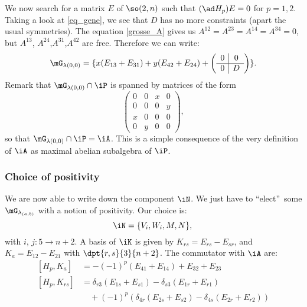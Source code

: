 We now search for a matrix $E$ of $\so(2,n)$ such that $(\ad H_p)E=0$ for $p=1,2$. Taking a look at \eqref{eq_gene}, we see that $D$ has no more constraints (apart the usual symmetries). The equation \eqref{grosse_A} gives us $A^{12}=A^{23}=A^{14}=A^{34}=0$, but $A^{13}$, $A^{24}$,$A^{31}$,$A^{42}$ are free. Therefore we can write:
\begin{equation}
	\mG_{\lambda(0,0)}=\{x(E_{13}+E_{31})+y(E_{42}+E_{24})+
	\left(\begin{array}{c|c}
			0 & 0 \\
			\hline
			0 & D
		\end{array}\right)
	\}.
\end{equation}
Remark that $\mG_{\lambda(0,0)}\cap\iP$ is spanned by matrices of the form
\[
	\begin{pmatrix}
		0 & 0 & x & 0 \\
		0 & 0 & 0 & y \\
		x & 0 & 0 & 0 \\
		0 & y & 0 & 0
	\end{pmatrix},
\]
so that $\mG_{\lambda(0,0)}\cap\iP=\iA$. This is a simple consequence of the very definition of $\iA$ as maximal abelian subalgebra of $\iP$.

\subsubsection{Choice of positivity}

We are now able to write down the component $\iN$. We just have to ``elect''\ some $\mG_{\lambda_{(a,b)}}$ with a notion of positivity. Our choice is:
\begin{equation}
	\iN=\{V_i,W_i,M,N\},\\
\end{equation}
with $i$, $j:5\to n+2$. A basis of $\iK$ is given by $K_{rs}=E_{rs}-E_{sr}$, and $K_a=E_{12}-E_{21}$ with $\dpt{r,s}{3}{n+2}$.  The commutator with $\iA$ are:
\begin{equation}
	\begin{split}
		[H_p,K_a]&=-(-1)^p(E_{41}+E_{14})+E_{32}+E_{23}\\
		[H_p,K_{rs}]&=\delta_{r3}(E_{1s}+E_{s1})-\delta_{s3}(E_{1r}+E_{r1})\\
		&\quad+(-1)^p(\delta_{4r}(E_{2s}+E_{s2})-\delta_{4s}(E_{2r}+E_{r2}))
	\end{split}
\end{equation}

